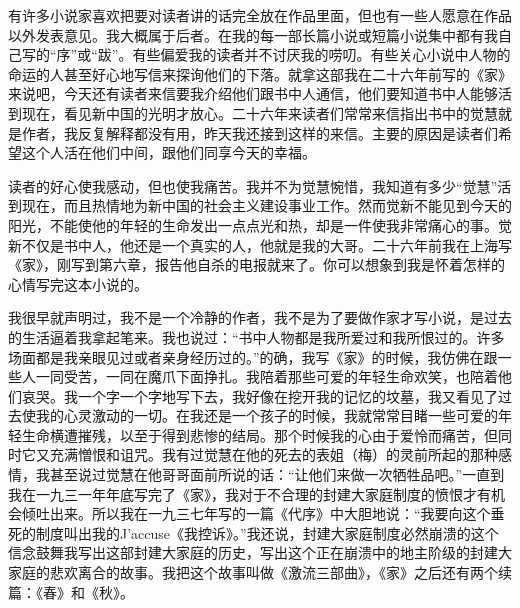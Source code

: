 \par 有许多小说家喜欢把要对读者讲的话完全放在作品里面，但也有一些人愿意在作品以外发表意见。我大概属于后者。在我的每一部长篇小说或短篇小说集中都有我自己写的“序”或“跋”。有些偏爱我的读者并不讨厌我的唠叨。有些关心小说中人物的命运的人甚至好心地写信来探询他们的下落。就拿这部我在二十六年前写的《家》来说吧，今天还有读者来信要我介绍他们跟书中人通信，他们要知道书中人能够活到现在，看见新中国的光明才放心。二十六年来读者们常常来信指出书中的觉慧就是作者，我反复解释都没有用，昨天我还接到这样的来信。主要的原因是读者们希望这个人活在他们中间，跟他们同享今天的幸福。
\par 读者的好心使我感动，但也使我痛苦。我并不为觉慧惋惜，我知道有多少“觉慧”活到现在，而且热情地为新中国的社会主义建设事业工作。然而觉新不能见到今天的阳光，不能使他的年轻的生命发出一点点光和热，却是一件使我非常痛心的事。觉新不仅是书中人，他还是一个真实的人，他就是我的大哥。二十六年前我在上海写《家》，刚写到第六章，报告他自杀的电报就来了。你可以想象到我是怀着怎样的心情写完这本小说的。
\par 我很早就声明过，我不是一个冷静的作者，我不是为了要做作家才写小说，是过去的生活逼着我拿起笔来。我也说过：“书中人物都是我所爱过和我所恨过的。许多场面都是我亲眼见过或者亲身经历过的。”的确，我写《家》的时候，我仿佛在跟一些人一同受苦，一同在魔爪下面挣扎。我陪着那些可爱的年轻生命欢笑，也陪着他们哀哭。我一个字一个字地写下去，我好像在挖开我的记忆的坟墓，我又看见了过去使我的心灵激动的一切。在我还是一个孩子的时候，我就常常目睹一些可爱的年轻生命横遭摧残，以至于得到悲惨的结局。那个时候我的心由于爱怜而痛苦，但同时它又充满憎恨和诅咒。我有过觉慧在他的死去的表姐（梅）的灵前所起的那种感情，我甚至说过觉慧在他哥哥面前所说的话：“让他们来做一次牺牲品吧。”一直到我在一九三一年年底写完了《家》，我对于不合理的封建大家庭制度的愤恨才有机会倾吐出来。所以我在一九三七年写的一篇《代序》中大胆地说：“我要向这个垂死的制度叫出我的J’accuse《我控诉》。”我还说，封建大家庭制度必然崩溃的这个信念鼓舞我写出这部封建大家庭的历史，写出这个正在崩溃中的地主阶级的封建大家庭的悲欢离合的故事。我把这个故事叫做《激流三部曲》，《家》之后还有两个续篇：《春》和《秋》。
